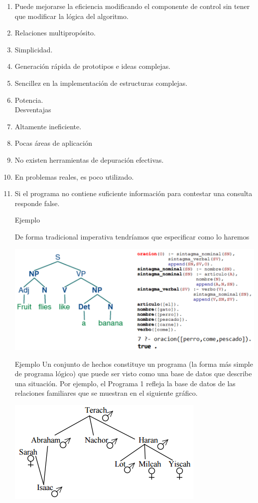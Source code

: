 \begin{enumerate}[1.]
\item Puede mejorarse la eficiencia modificando el componente de control sin tener que modificar la lógica del algoritmo.
\item Relaciones multipropósito.
\item Simplicidad.
\item Generación rápida de prototipos e ideas complejas.
\item Sencillez en la implementación de estructuras complejas.
\item Potencia.
\\
Desventajas
\\
\item Altamente ineficiente.
\item Pocas áreas de aplicación
\item No existen herramientas de depuración efectivas.
\item En problemas reales, es poco utilizado.
\item Si el programa no contiene suficiente información para contestar una consulta responde false.
	

	
Ejemplo

De forma tradicional imperativa tendríamos que especificar como lo haremos

\begin{center}
\includegraphics[scale=0.50]{./Imagenes/img08.png} 
\end{center}

Ejemplo
Un conjunto de hechos constituye un programa (la forma más simple de programa lógico) que puede ser visto como una base de datos que describe una situación. Por ejemplo, el Programa 1 refleja la base de datos de las relaciones familiares que se muestran en el siguiente gráfico.

\begin{center}
\includegraphics[scale=0.50]{./Imagenes/img09.png} 
\end{center}


\end{enumerate}
